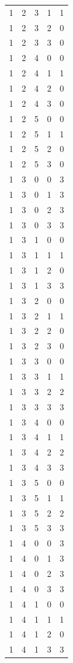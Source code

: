 \begin{longtable}{rrrrr}
1 & 2 & 3 & 1 & 1 \\
1 & 2 & 3 & 2 & 0 \\
1 & 2 & 3 & 3 & 0 \\
1 & 2 & 4 & 0 & 0 \\
1 & 2 & 4 & 1 & 1 \\
1 & 2 & 4 & 2 & 0 \\
1 & 2 & 4 & 3 & 0 \\
1 & 2 & 5 & 0 & 0 \\
1 & 2 & 5 & 1 & 1 \\
1 & 2 & 5 & 2 & 0 \\
1 & 2 & 5 & 3 & 0 \\
1 & 3 & 0 & 0 & 3 \\
1 & 3 & 0 & 1 & 3 \\
1 & 3 & 0 & 2 & 3 \\
1 & 3 & 0 & 3 & 3 \\
1 & 3 & 1 & 0 & 0 \\
1 & 3 & 1 & 1 & 1 \\
1 & 3 & 1 & 2 & 0 \\
1 & 3 & 1 & 3 & 3 \\
1 & 3 & 2 & 0 & 0 \\
1 & 3 & 2 & 1 & 1 \\
1 & 3 & 2 & 2 & 0 \\
1 & 3 & 2 & 3 & 0 \\
1 & 3 & 3 & 0 & 0 \\
1 & 3 & 3 & 1 & 1 \\
1 & 3 & 3 & 2 & 2 \\
1 & 3 & 3 & 3 & 3 \\
1 & 3 & 4 & 0 & 0 \\
1 & 3 & 4 & 1 & 1 \\
1 & 3 & 4 & 2 & 2 \\
1 & 3 & 4 & 3 & 3 \\
1 & 3 & 5 & 0 & 0 \\
1 & 3 & 5 & 1 & 1 \\
1 & 3 & 5 & 2 & 2 \\
1 & 3 & 5 & 3 & 3 \\
1 & 4 & 0 & 0 & 3 \\
1 & 4 & 0 & 1 & 3 \\
1 & 4 & 0 & 2 & 3 \\
1 & 4 & 0 & 3 & 3 \\
1 & 4 & 1 & 0 & 0 \\
1 & 4 & 1 & 1 & 1 \\
1 & 4 & 1 & 2 & 0 \\
1 & 4 & 1 & 3 & 3 \\

\end{longtable}

